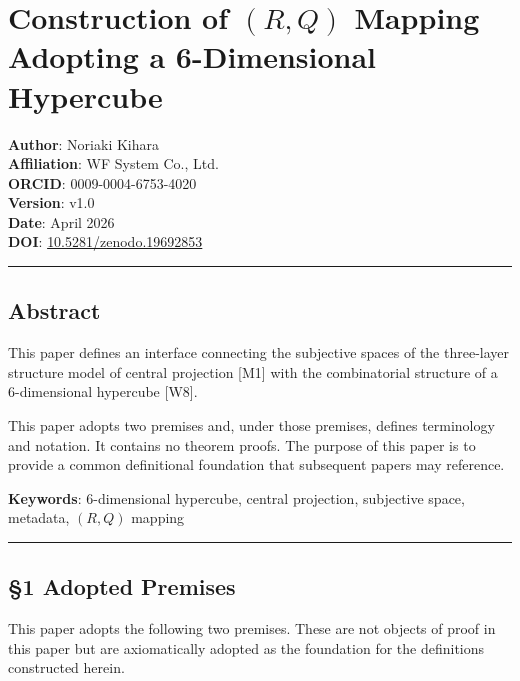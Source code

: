 \documentclass[
  a4paper,11pt]{article}
\theoremstyle{definition}
\theoremstyle{remark}
\begin{document}
\section{\texorpdfstring{Construction of \((R, Q)\) Mapping Adopting a
6-Dimensional
Hypercube}{Construction of (R, Q) Mapping Adopting a 6-Dimensional Hypercube}}\label{construction-of-r-q-mapping-adopting-a-6-dimensional-hypercube}

\textbf{Author}: Noriaki Kihara\\
\textbf{Affiliation}: WF System Co., Ltd.\\
\textbf{ORCID}: 0009-0004-6753-4020\\
\textbf{Version}: v1.0\\
\textbf{Date}: April 2026\\
\textbf{DOI}:
\href{https://doi.org/10.5281/zenodo.19692853}{10.5281/zenodo.19692853}

\begin{center}\rule{0.5\linewidth}{0.5pt}\end{center}

\subsection{Abstract}\label{abstract}

This paper defines an interface connecting the subjective spaces of the
three-layer structure model of central projection {[}M1{]} with the
combinatorial structure of a 6-dimensional hypercube {[}W8{]}.

This paper adopts two premises and, under those premises, defines
terminology and notation. It contains no theorem proofs. The purpose of
this paper is to provide a common definitional foundation that
subsequent papers may reference.

\textbf{Keywords}: 6-dimensional hypercube, central projection,
subjective space, metadata, \((R, Q)\) mapping

\begin{center}\rule{0.5\linewidth}{0.5pt}\end{center}

\subsection{§1 Adopted Premises}\label{adopted-premises}

This paper adopts the following two premises. These are not objects of
proof in this paper but are axiomatically adopted as the foundation for
the definitions constructed herein.
\end{document}

